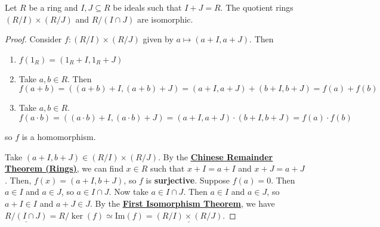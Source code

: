 \documentclass [12pt] {article}
\newenvironment{theorem}[1]{\begin{tcolorbox}[title={Theorem #1},colback=green!5!white,colframe=black!75!green]}{\end{tcolorbox}}
\renewcommand{\href}[2]{\hyperref[#1]{\bf{\underline{{#2}}}}}
\renewcommand{\bf}[1]{\textbf{{#1}}}
\newcommand{\ul}[1]{\underline{{#1}}}
\renewcommand{\Im}{\text{Im}}
\begin{document}
\newpage
\begin{theorem}{(Chinese Remainder Theorem (Isomorphism))}
    Let $R$ be a ring and $I, J \subseteq R$ be ideals such that $I + J = R$. The quotient rings
    $(R/I) \times (R/J)$ and $R/(I \cap J)$ are isomorphic.
\end{theorem}
\begin{proof}
    Consider $f : (R/I) \times (R/J)$ given by $a \mapsto (a + I, a + J)$. Then
    \begin{enumerate}[label=(\arabic*)]
        \item $f(1_R) = (1_R + I, 1_R + J)$
        \item Take $a, b \in R$. Then
            \vspace{-0.5em}
            \[
                f(a + b) 
                = ((a + b) + I, (a + b) + J) 
                = (a + I, a + J) + (b + I, b + J) 
                = f(a) + f(b)
            \]
        \item \vspace{-0.5em} Take $a, b \in R$.
            \vspace{-0.5em}
            \[
                f(a \cdot b) 
                = ((a \cdot b) + I, (a \cdot b) + J) 
                = (a + I, a + J) \cdot (b + I, b + J) 
                = f(a) \cdot f(b)
            \]
    \end{enumerate}
    so $f$ is a homomorphism. 
    \vspace{1em}

    Take $(a + I, b + J) \in (R/I) \times (R/J)$. By the
    \href{thm:crtrings}{Chinese Remainder Theorem (Rings)}, we can find $x \in R$ such that
    $x + I = a + I$ and $x + J = a + J$. Then, $f(x) = (a + I, b + J)$, so $f$ is \bf{surjective}.
    Suppose $f(a) = 0$. Then $a \in I$ and $a \in J$, so $a \in I \cap J$. Now take 
    $a \in I \cap J$. Then $a \in I$ and $a \in J$, so $a + I \in I$ and $a + J \in J$. 
    By the \href{thm:isothm}{First Isomorphism Theorem}, we have 
    $\ul{R/(I \cap J)} = R/\ker(f) \simeq \Im(f) = \ul{(R/I) \times (R/J)}$.
\end{proof}
\end{document}
